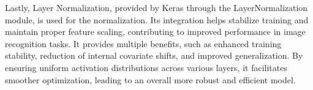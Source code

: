 Lastly, Layer Normalization, provided by Keras through the LayerNormalization module, is used for the normalization. Its integration helps stabilize training and maintain proper feature scaling, contributing to improved performance in image recognition tasks. It provides multiple benefits, such as enhanced training stability, reduction of internal covariate shifts, and improved generalization. By ensuring uniform activation distributions across various layers, it facilitates smoother optimization, leading to an overall more robust and efficient model.
\newpage